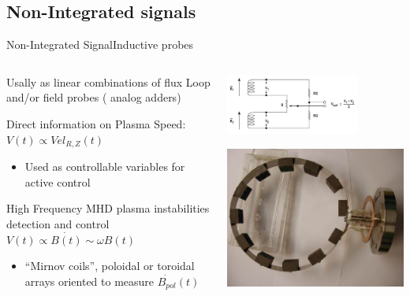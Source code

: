 \documentclass{beamer}
\begin{document}
\subsection{Non-Integrated signals}
\begin{frame}{Non-Integrated Signal}{Inductive probes}
\begin{columns}
	\begin{itemize}
		 { \item Usally as linear combinations of flux Loop and/or field probes ( analog adders)
			        \item Direct information on Plasma Speed:  $V(t) \propto Vel_{R,Z}(t)$
			\begin{itemize}
				\item Used as controllable variables for active control
			\end{itemize} 
 		}
		 {\item High Frequency MHD plasma instabilities  detection and control $V(t) \propto \dot{B(t)}  \sim \omega B(t)$
			\begin{itemize}
				\item “Mirnov coils”, poloidal or toroidal arrays  oriented to measure $\dot{B_{pol}}(t) $%
			\end{itemize}
		}
	\end{itemize}

	\begin{center}
		\includegraphics[trim = 0mm 0mm 0mm 1mm, clip, height = 2cm]{probesSum.png}
		
		\includegraphics[height = 2.cm]{isttokMirn.jpg}
	\end{center}
\end{columns}
\end{frame}
\end{document}
